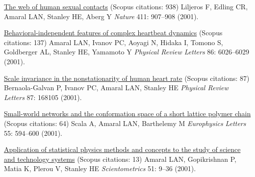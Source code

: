 \NumberedItem{\makebox[0.8cm][r]{[38]}}
\href{/people/amaral/the-web-of-human-sexual-contacts}
{The web of human sexual contacts}
    (Scopus citations: 938)
\newline
Liljeros F, Edling CR, Amaral LAN, Stanley HE, Aberg Y
\newline
\textit{Nature}
    411:
907--908 (2001).
\newline
\Gap
~
\Gap

\NumberedItem{\makebox[0.8cm][r]{[37]}}
\href{/people/amaral/behavioral-independence-features-of-complex-heartbeat-dynamics}
{Behavioral-independent features of complex heartbeat dynamics}
    (Scopus citations: 137)
\newline
Amaral LAN, Ivanov PC, Aoyagi N, Hidaka I, Tomono S, Goldberger AL, Stanley HE, Yamamoto Y
\newline
\textit{Physical Review Letters}
    86:
6026--6029 (2001).
\newline
\Gap
~
\Gap

\NumberedItem{\makebox[0.8cm][r]{[36]}}
\href{/people/amaral/scale-invariance-in-the-nonstationarity-of-human-heart-rate}
{Scale invariance in the nonstationarity of human heart rate}
    (Scopus citations: 87)
\newline
Bernaola-Galvan P, Ivanov PC, Amaral LAN, Stanley HE
\newline
\textit{Physical Review Letters}
    87:
168105 (2001).
\newline
\Gap
~
\Gap

\NumberedItem{\makebox[0.8cm][r]{[35]}}
\href{/people/amaral/small-world-networks-and-the-conformation-space-of-a-short-lattice-polymer-chain}
{Small-world networks and the conformation space of a short lattice polymer chain}
    (Scopus citations: 64)
\newline
Scala A, Amaral LAN, Barthelemy M
\newline
\textit{Europhysics Letters}
    55:
594--600 (2001).
\newline
\Gap
~
\Gap

\NumberedItem{\makebox[0.8cm][r]{[34]}}
\href{/people/amaral/application-of-statistical-physics-methods-and-concepts-to-the-study-of-science-technology-systems}
{Application of statistical physics methods and concepts to the study of science and technology systems}
    (Scopus citations: 13)
\newline
Amaral LAN, Gopikrishnan P, Matia K, Plerou V, Stanley HE
\newline
\textit{Scientometrics}
    51:
9--36 (2001).
\newline
\Gap
~
\Gap

